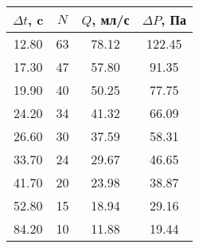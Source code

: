 \begin{tabular}{c|c|c|c}
\toprule
$\Delta t$, c & $N$ & $Q$, мл/с & $\Delta P$, Па \\
\midrule
12.80 & 63 & 78.12 & 122.45 \\
17.30 & 47 & 57.80 & 91.35 \\
19.90 & 40 & 50.25 & 77.75 \\
24.20 & 34 & 41.32 & 66.09 \\
26.60 & 30 & 37.59 & 58.31 \\
33.70 & 24 & 29.67 & 46.65 \\
41.70 & 20 & 23.98 & 38.87 \\
52.80 & 15 & 18.94 & 29.16 \\
84.20 & 10 & 11.88 & 19.44 \\
\bottomrule
\end{tabular}
